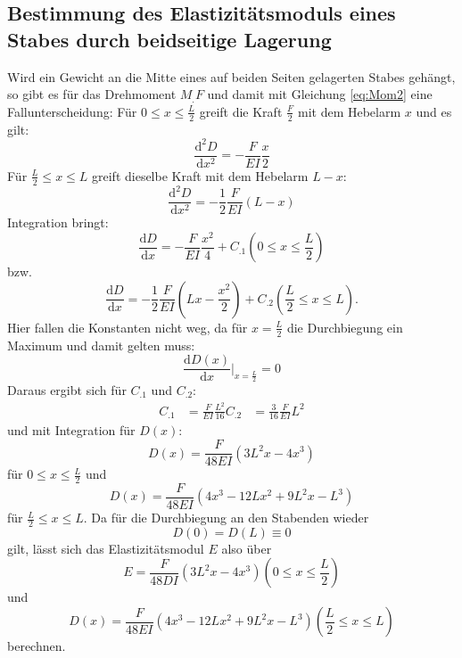 \subsection{Bestimmung des Elastizitätsmoduls eines Stabes durch beidseitige Lagerung}

Wird ein Gewicht an die Mitte eines auf beiden Seiten gelagerten Stabes gehängt, so gibt es für das Drehmoment $M_.F$ und damit mit Gleichung \eqref{eq:Mom2} eine Fallunterscheidung:
Für $0 \leq x \leq \frac{L}{2}$ greift die Kraft $\frac{F}{2}$ mit dem Hebelarm $x$ und es gilt:
\[
\frac{\mathrm{d}^2D}{\mathrm{d}x^2} = -\frac{F}{E I}\frac{x}{2}
\]
Für $\frac{L}{2} \leq x \leq L$ greift dieselbe Kraft mit dem Hebelarm $L-x$:
\[
\frac{\mathrm{d}^2D}{\mathrm{d}x^2} = -\frac{1}{2}\frac{F}{E I} (L-x)
\]
Integration bringt:
\[
\frac{\mathrm{d}D}{\mathrm{d}x} = -\frac{F}{E I}\frac{x^2}{4} + C_.1  \left(0 \leq x \leq \frac{L}{2}\right)
\]
bzw.
\[
\frac{\mathrm{d}D}{\mathrm{d}x} = -\frac{1}{2}\frac{F}{E I}\left(L x - \frac{x^2}{2}\right) + C_.2  \left(\frac{L}{2} \leq x \leq L\right) \text{.}
\]
Hier fallen die Konstanten nicht weg, da für $x = \frac{L}{2}$ die Durchbiegung ein Maximum und damit gelten muss:
\[
\frac{\mathrm{d}D(x)}{\mathrm{d}x}|_{x = \frac{L}{2}} = 0
\]
Daraus ergibt sich für $C_.1$ und $C_.2$:
\begin{align*}
C_.1 &= \frac{F}{E I}\frac{L^2}{16}
C_.2 &= \frac{3}{16}\frac{F}{E I} L^2
\end{align*}
und mit Integration für $D(x)$:
\begin{equation*}
D(x) = \frac{F}{48 E I}\left(3 L^2 x - 4 x^3\right)
\end{equation*}
für $0 \leq x \leq \frac{L}{2}$ und
\begin{equation*}
D(x) = \frac{F}{48 E I}\left(4 x^3 - 12 L x^2 + 9 L^2 x - L^3\right)
\end{equation*}
für $\frac{L}{2} \leq x \leq L$.
Da für die Durchbiegung an den Stabenden wieder \[D(0)=D(L)\equiv 0 \] gilt, lässt sich das Elastizitätsmodul $E$ also über
\begin{equation}
E = \frac{F}{48 D I}\left(3 L^2 x - 4 x^3\right)   \left(0 \leq x \leq \frac{L}{2}\right)
\end{equation}
und
\begin{equation}
D(x) = \frac{F}{48 E I}\left(4 x^3 - 12 L x^2 + 9 L^2 x - L^3\right)  \left(\frac{L}{2} \leq x \leq L\right)
\end{equation}
berechnen.